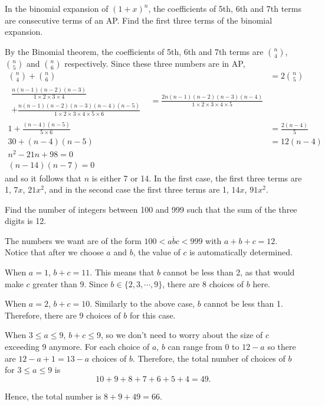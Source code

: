 \begin{question}
    In the binomial expansion of $(1 + x)^n$, the coefficients of 5th, 6th and
    7th terms are consecutive terms of an AP. Find the first three terms of the
    binomial expansion.
\end{question}
\begin{solution}
    By the Binomial theorem, the coefficients of 5th, 6th and 7th terms are
    $\binom{n}{4}$, $\binom{n}{5}$ and $\binom{n}{6}$ respectively. Since these
    three numbers are in AP,
    \begin{align*}
        \binom{n}{4} + \binom{n}{6} &= 2\binom{n}{5}\\
        \begin{split}
            \frac{n(n - 1)(n - 2)(n - 3)}{1 \times 2 \times 3 \times 4}\\
            + \frac{n(n - 1)(n - 2)(n - 3)(n - 4)(n - 5)}{1 \times 2 \times 3 \times 4 \times 5 \times 6} &
        \end{split} 
        = \frac{2n(n - 1)(n - 2)(n - 3)(n - 4)}{1 \times 2 \times 3 \times 4 \times 5}\\
        1 + \frac{(n - 4)(n - 5)}{5 \times 6} &= \frac{2(n - 4)}{5}\\
        30 + (n - 4)(n - 5) &= 12(n - 4)\\
        n^2 - 21n + 98 = 0\\
        (n - 14)(n - 7) = 0
    \end{align*}
    and so it follows that $n$ is either 7 or 14. In the first case, the first
    three terms are 1, $7x$, $21x^2$, and in the second case the first three
    terms are 1, $14x$, $91x^2$.
\end{solution}

\begin{question}
    Find the number of integers between 100 and 999 such that the sum of the
    three digits is 12.
\end{question}
\begin{solution}
    The numbers we want are of the form $100 < \overline{abc} < 999$ with $a +
    b + c = 12$. Notice that after we choose $a$ and $b$, the value of $c$ is
    automatically determined. 
    
    When $a = 1$, $b + c = 11$. This means that $b$ cannot be less than 2, as
    that would make $c$ greater than 9. Since $b \in \{2, 3, \cdots, 9\}$,
    there are 8 choices of $b$ here.

    When $a = 2$, $b + c = 10$. Similarly to the above case, $b$ cannot be less
    than 1. Therefore, there are 9 choices of $b$ for this case.

    When $3 \leq a \leq 9$, $b + c \leq 9$, so we don't need to worry about the
    size of $c$ exceeding 9 anymore. For each choice of $a$, $b$ can range from
    0 to $12 - a$ so there are $12 - a + 1 = 13 - a$ choices of $b$. Therefore,
    the total number of choices of $b$ for $3 \leq a \leq 9$ is 
    \[10 + 9 + 8 + 7 + 6 + 5 + 4 = 49.\] 

    Hence, the total number is $8 + 9 + 49 = 66$.
\end{solution}

